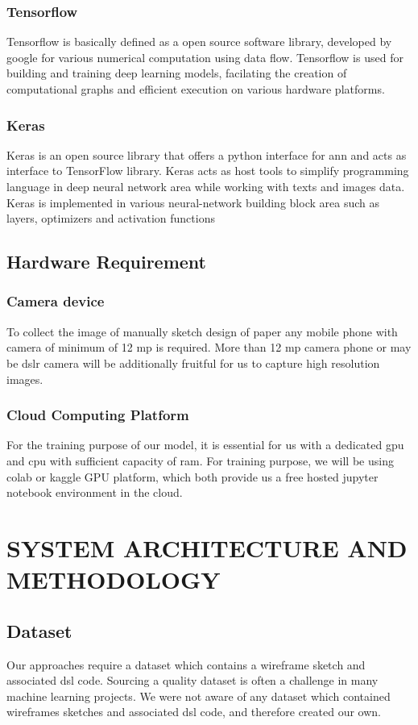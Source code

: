 \documentclass{ioereport}
\begin{document}
\subsubsection{Tensorflow}
Tensorflow is basically defined as a open source software library, developed by google
for various numerical computation using data flow. Tensorflow is used for building and
training deep learning models, facilating the creation of computational graphs and
efficient execution on various hardware platforms.
\subsubsection{Keras}
Keras is an open source library that offers a python interface for \gls{ann} and acts as interface to TensorFlow library. Keras acts as host tools to
simplify programming language in deep neural network area while working with texts
and images data. Keras is implemented in various neural-network building block area
such as layers, optimizers and activation functions
\pagebreak
    \subsection{Hardware Requirement}
    \subsubsection{Camera device}
    To collect the image of manually sketch design of paper any mobile phone with camera
of minimum of 12 \gls{mp} is required. More than 12 \gls{mp} camera phone or may be \gls{dslr}
camera will be additionally fruitful for us to capture high resolution images.
    \subsubsection{Cloud Computing Platform}
    For the training purpose of our model, it is essential for us with a dedicated \gls{gpu} and
\gls{cpu} with sufficient capacity of \gls{ram}. For training purpose, we will be using colab or
kaggle GPU platform, which both provide us a free hosted jupyter notebook
environment in the cloud.
    \pagebreak
    
\section{\MakeUppercase{System Architecture and Methodology}}
\subsection{Dataset}
Our approaches require a dataset which contains a wireframe sketch and associated
\gls{dsl} code. Sourcing a quality dataset is often a challenge in many machine learning
projects. We were not aware of any dataset which contained wireframes sketches and
associated \gls{dsl} code, and therefore created our own.
\end{document}
